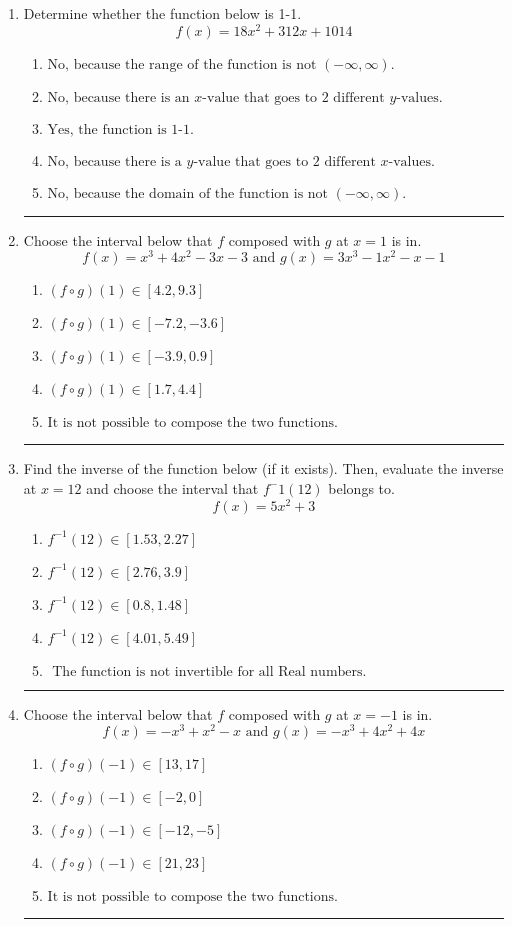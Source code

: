 \documentclass[14pt]{extbook}
\newcommand{\litem}[1]{\item#1\hspace*{-1cm}\rule{\textwidth}{0.4pt}}
\begin{document}
\begin{enumerate}
{\begin{enumerate}[label=\Alph*.]
\end{enumerate} }
\litem{
Determine whether the function below is 1-1.\[ f(x) = 18 x^2 + 312 x + 1014 \]\begin{enumerate}[label=\Alph*.]
\item \( \text{No, because the range of the function is not $(-\infty, \infty)$.} \)
\item \( \text{No, because there is an $x$-value that goes to 2 different $y$-values.} \)
\item \( \text{Yes, the function is 1-1.} \)
\item \( \text{No, because there is a $y$-value that goes to 2 different $x$-values.} \)
\item \( \text{No, because the domain of the function is not $(-\infty, \infty)$.} \)

\end{enumerate} }
\litem{
Choose the interval below that $f$ composed with $g$ at $x=1$ is in.\[ f(x) = x^{3} +4 x^{2} -3 x -3 \text{ and } g(x) = 3x^{3} -1 x^{2} -x -1 \]\begin{enumerate}[label=\Alph*.]
\item \( (f \circ g)(1) \in [4.2, 9.3] \)
\item \( (f \circ g)(1) \in [-7.2, -3.6] \)
\item \( (f \circ g)(1) \in [-3.9, 0.9] \)
\item \( (f \circ g)(1) \in [1.7, 4.4] \)
\item \( \text{It is not possible to compose the two functions.} \)

\end{enumerate} }
\litem{
Find the inverse of the function below (if it exists). Then, evaluate the inverse at $x = 12$ and choose the interval that $f^-1(12)$ belongs to.\[ f(x) = 5 x^2 + 3 \]\begin{enumerate}[label=\Alph*.]
\item \( f^{-1}(12) \in [1.53, 2.27] \)
\item \( f^{-1}(12) \in [2.76, 3.9] \)
\item \( f^{-1}(12) \in [0.8, 1.48] \)
\item \( f^{-1}(12) \in [4.01, 5.49] \)
\item \( \text{ The function is not invertible for all Real numbers. } \)

\end{enumerate} }
\litem{
Choose the interval below that $f$ composed with $g$ at $x=-1$ is in.\[ f(x) = -x^{3} + x^{2} -x \text{ and } g(x) = -x^{3} +4 x^{2} +4 x \]\begin{enumerate}[label=\Alph*.]
\item \( (f \circ g)(-1) \in [13, 17] \)
\item \( (f \circ g)(-1) \in [-2, 0] \)
\item \( (f \circ g)(-1) \in [-12, -5] \)
\item \( (f \circ g)(-1) \in [21, 23] \)
\item \( \text{It is not possible to compose the two functions.} \)


\end{enumerate}}
\end{enumerate}
\end{document}
